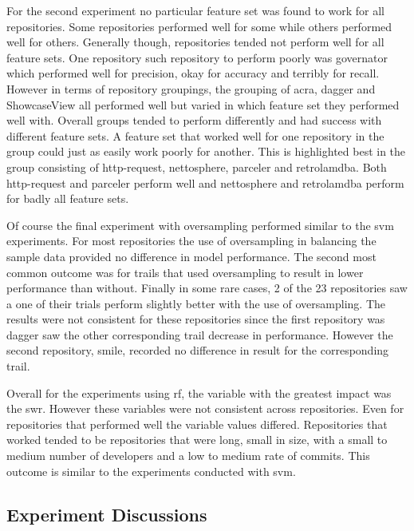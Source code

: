 For the second experiment no particular feature set was found to work for all repositories. Some repositories performed well for some while others performed well for others. Generally though, repositories tended not perform well for all feature sets. One repository such repository to perform poorly was governator which performed well for precision, okay for accuracy and terribly for recall. However in terms of repository groupings, the grouping of acra, dagger and ShowcaseView all performed well but varied in which feature set they performed well with. Overall groups tended to perform differently and had success with different feature sets. A feature set that worked well for one repository in the group could just as easily work poorly for another. This is highlighted best in the group consisting of http-request, nettosphere, parceler and retrolamdba. Both http-request and parceler perform well and nettosphere and retrolamdba perform for badly all feature sets.

Of course the final experiment with oversampling performed similar to the \gls{svm} experiments. For most repositories the use of oversampling in balancing the sample data provided no difference in model performance. The second most common outcome was for trails that used oversampling to result in lower performance than without. Finally in some rare cases, 2 of the 23 repositories saw a one of their trials perform slightly better with the use of oversampling. The results were not consistent for these repositories since the first repository was dagger saw the other corresponding trail decrease in performance. However the second repository, smile, recorded no difference in result for the corresponding trail.

Overall for the experiments using \gls{rf}, the variable with the greatest impact was the \gls{swr}. However these variables were not consistent across repositories. Even for repositories that performed well the variable values differed. Repositories that worked tended to be repositories that were long, small in size, with a small to medium number of developers and a low to medium rate of commits. This outcome is similar to the experiments conducted with \gls{svm}.

\subsection{Experiment Discussions}


